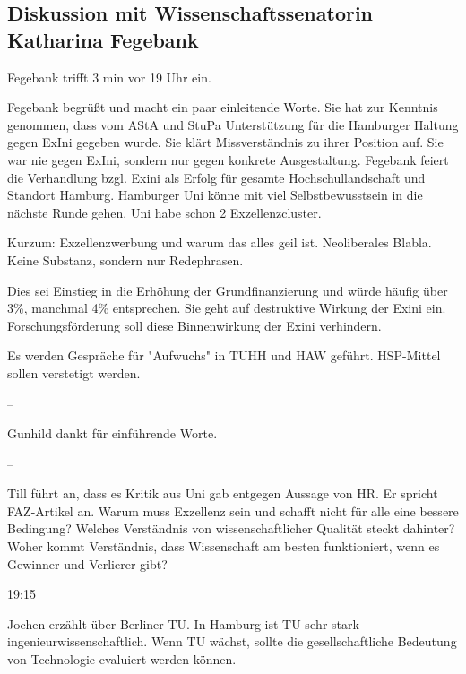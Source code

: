 \documentclass[ngerman,headheight=70pt]{scrartcl}
\begin{document}

    \subsection{Diskussion mit Wissenschaftssenatorin Katharina Fegebank}

    Fegebank trifft 3 min vor 19 Uhr ein.

    Fegebank begrüßt und macht ein paar einleitende Worte. Sie hat zur Kenntnis
    genommen, dass vom AStA und StuPa Unterstützung für die Hamburger Haltung
    gegen ExIni gegeben wurde. Sie klärt Missverständnis zu ihrer Position auf.
    Sie war nie gegen ExIni, sondern nur gegen konkrete Ausgestaltung. Fegebank
    feiert die Verhandlung bzgl. Exini als Erfolg für gesamte Hochschullandschaft
    und Standort Hamburg. Hamburger Uni könne mit viel Selbstbewusstsein in die
    nächste Runde gehen. Uni habe schon 2 Exzellenzcluster.

    Kurzum: Exzellenzwerbung und warum das alles geil ist. Neoliberales Blabla.
    Keine Substanz, sondern nur Redephrasen.

    Dies sei Einstieg in die Erhöhung der Grundfinanzierung und würde häufig
    über 3\%, manchmal 4\% entsprechen. Sie geht auf destruktive Wirkung der
    Exini ein. Forschungsförderung soll diese Binnenwirkung der Exini verhindern.

    Es werden Gespräche für "Aufwuchs" in TUHH und HAW geführt. HSP-Mittel sollen
    verstetigt werden.

    --

    Gunhild dankt für einführende Worte.

    --

    Till führt an, dass es Kritik aus Uni gab entgegen Aussage von HR.
    Er spricht FAZ-Artikel an.
    Warum muss Exzellenz sein und schafft nicht für alle eine bessere
    Bedingung? Welches Verständnis von wissenschaftlicher Qualität steckt
    dahinter? Woher kommt Verständnis, dass Wissenschaft am besten funktioniert,
    wenn es Gewinner und Verlierer gibt?

    19:15

    Jochen erzählt über Berliner TU. In Hamburg ist TU sehr stark
    ingenieurwissenschaftlich. Wenn TU wächst, sollte die gesellschaftliche
    Bedeutung von Technologie evaluiert werden können.
\end{document}
